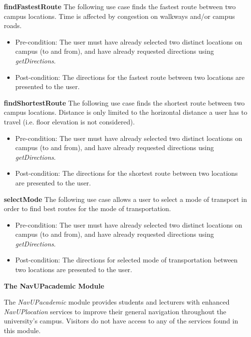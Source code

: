 \documentclass[12pt,a4paper]{article}
\begin{document}
		    \textbf{findFastestRoute}
			The following use case finds the fastest route between two campus locations. Time is affected by congestion on 				    walkways and/or campus roads.
			
			\begin{itemize}
			\item Pre-condition: The user must have already selected two distinct locations on campus (to and from), and have 					  already requested directions using \textit{getDirections}.
			\item Post-condition: The directions for the fastest route between two locations are presented to the user.
			\end{itemize}
			
			\textbf{findShortestRoute}
			The following use case finds the shortest route between two campus locations. Distance is only limited to the 				    horizontal distance a user has to travel (i.e. floor elevation is not considered). 
			
			\begin{itemize}
			\item Pre-condition: The user must have already selected two distinct locations on campus (to and from), and have 					  already requested directions using \textit{getDirections}.
			\item Post-condition: The directions for the shortest route between two locations are presented to the user.
			\end{itemize}
			
			\textbf{selectMode}
			The following use case allows a user to select a mode of transport in order to find best routes for the mode of 		        transportation. 
			
			\begin{itemize}
			\item Pre-condition: The user must have already selected two distinct locations on campus (to and from), and have 					  already requested directions using \textit{getDirections}.
			\item Post-condition: The directions for selected mode of transportation between two locations are presented to     				  the user.
			\end{itemize}
			
	    \textbf{The NavUPacademic Module} \newline
	    
	    The \textit{NavUPacademic} module provides students and lecturers with enhanced \textit{NavUPlocation} services to 				improve their general navigation throughout the university's campus. Visitors do not have access to any of the 				    services found in this module.
	    
\end{document}
